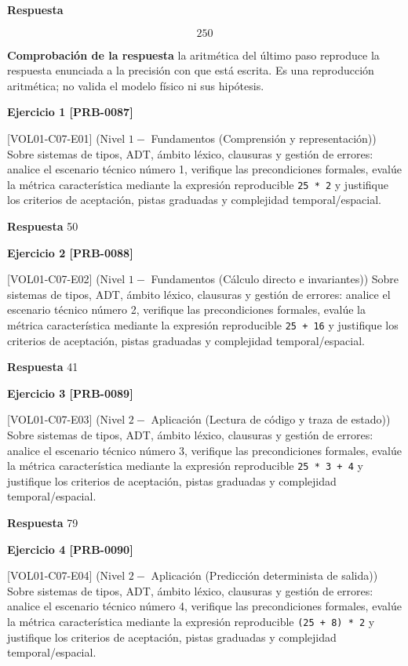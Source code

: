 \documentclass{book}
\begin{document}
\noindent\textbf{Respuesta}

\[
250
\]

\noindent\textbf{Comprobación de la respuesta} la aritmética del último paso reproduce la respuesta enunciada a la precisión con que está escrita. Es una reproducción aritmética; no valida el modelo físico ni sus hipótesis.

\noindent\textbf{Ejercicio 1 [PRB-0087]}

[VOL01-C07-E01] (Nivel \(1 -\) Fundamentos (Comprensión y representación)) Sobre sistemas de tipos, ADT, ámbito léxico, clausuras y gestión de errores: analice el escenario técnico número 1, verifique las precondiciones formales, evalúe la métrica característica mediante la expresión reproducible \texttt{25 * 2} y justifique los criterios de aceptación, pistas graduadas y complejidad temporal/espacial.

\noindent\textbf{Respuesta} 50

\noindent\textbf{Ejercicio 2 [PRB-0088]}

[VOL01-C07-E02] (Nivel \(1 -\) Fundamentos (Cálculo directo e invariantes)) Sobre sistemas de tipos, ADT, ámbito léxico, clausuras y gestión de errores: analice el escenario técnico número 2, verifique las precondiciones formales, evalúe la métrica característica mediante la expresión reproducible \texttt{25 + 16} y justifique los criterios de aceptación, pistas graduadas y complejidad temporal/espacial.

\noindent\textbf{Respuesta} 41

\noindent\textbf{Ejercicio 3 [PRB-0089]}

[VOL01-C07-E03] (Nivel \(2 -\) Aplicación (Lectura de código y traza de estado)) Sobre sistemas de tipos, ADT, ámbito léxico, clausuras y gestión de errores: analice el escenario técnico número 3, verifique las precondiciones formales, evalúe la métrica característica mediante la expresión reproducible \texttt{25 * 3 + 4} y justifique los criterios de aceptación, pistas graduadas y complejidad temporal/espacial.

\noindent\textbf{Respuesta} 79

\noindent\textbf{Ejercicio 4 [PRB-0090]}

[VOL01-C07-E04] (Nivel \(2 -\) Aplicación (Predicción determinista de salida)) Sobre sistemas de tipos, ADT, ámbito léxico, clausuras y gestión de errores: analice el escenario técnico número 4, verifique las precondiciones formales, evalúe la métrica característica mediante la expresión reproducible \texttt{(25 + 8) * 2} y justifique los criterios de aceptación, pistas graduadas y complejidad temporal/espacial.
\end{document}
